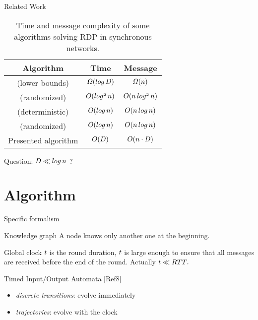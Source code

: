 \documentclass[10pt, compress]{beamer}
\begin{document}

\begin{frame}{Related Work}

\begin{table}
\caption{Time and message complexity of some algorithms solving RDP in synchronous networks.}
\label{tab:tc}
\begin{center}
\begin{tabular}{||c||c|c||}
\hline
Algorithm & Time & Message \\
\hline
\hline
[Ref9] (lower bounds) & $\mathnormal{\Omega(log \, D)}$ & $\mathnormal{\Omega(n)}$\\
\hline
[Ref6] (randomized) & $\mathnormal{O(log^2 \, n)}$ & $\mathnormal{O(n \, log^2 \, n)}$\\
\hline
[Ref12] (deterministic) & $\mathnormal{O(log \, n)}$ & $\mathnormal{O(n \, log \, n)}$\\
\hline
[Ref13] (randomized) & $\mathnormal{O(log \, n)}$ & $\mathnormal{O(n \, log \, n)}$\\
\hline
Presented algorithm & $\mathnormal{O(D)}$ & $\mathnormal{O(n \cdot D)}$\\
\hline
\end{tabular}
\end{center}
\end{table}

Question: $\mathnormal{D \ll log \, n}$ ?

\end{frame}


\section{Algorithm}


\begin{frame}{Specific formalism}

\begin{block}{Knowledge graph}
A node knows only another one at the beginning.
\end{block}

\begin{block}{Global clock}
$\mathnormal{t}$ is the round duration, $ \mathnormal{t}$ is large enough to ensure that all messages are received before the end of the round. Actually $\mathnormal{t \ll RTT}.$
\end{block}

\begin{block}{Timed Input/Output Automata [Ref8]}
\begin{itemize}
\item \emph{discrete transitions}: evolve immediately %
\item \emph{trajectories}: evolve with the clock%
\end{itemize}
\end{block}

\end{frame}
\end{document}
